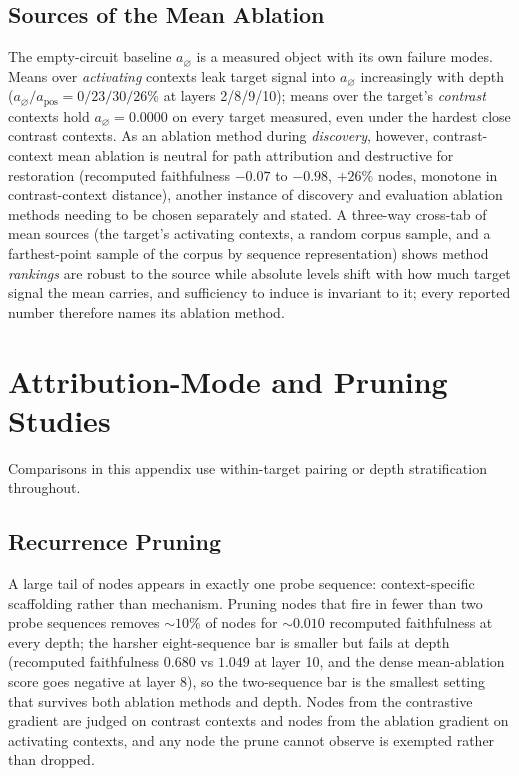 \documentclass[10pt]{article}
\begin{document}
\subsection{Sources of the Mean Ablation}
\label{app:floors}
The empty-circuit baseline $a_{\varnothing}$ is a measured object with its own failure modes.
Means over \emph{activating} contexts leak target signal into $a_{\varnothing}$ increasingly with depth ($a_{\varnothing}/a_{\mathrm{pos}} = 0/23/30/26\%$ at layers 2/8/9/10); means over the target's \emph{contrast} contexts hold $a_{\varnothing} = 0.0000$ on every target measured, even under the hardest close contrast contexts.
As an ablation method during \emph{discovery}, however, contrast-context mean ablation is neutral for path attribution and destructive for restoration (recomputed faithfulness $-0.07$ to $-0.98$, $+26\%$ nodes, monotone in contrast-context distance), another instance of discovery and evaluation ablation methods needing to be chosen separately and stated.
A three-way cross-tab of mean sources (the target's activating contexts, a random corpus sample, and a farthest-point sample of the corpus by sequence representation) shows method \emph{rankings} are robust to the source while absolute levels shift with how much target signal the mean carries, and sufficiency to induce is invariant to it; every reported number therefore names its ablation method.

\section{Attribution-Mode and Pruning Studies}
\label{app:mode-studies}

Comparisons in this appendix use within-target pairing or depth stratification throughout.

\subsection{Recurrence Pruning}
A large tail of nodes appears in exactly one probe sequence: context-specific scaffolding rather than mechanism.
Pruning nodes that fire in fewer than two probe sequences removes ${\sim}10\%$ of nodes for ${\sim}0.010$ recomputed faithfulness at every depth; the harsher eight-sequence bar is smaller but fails at depth (recomputed faithfulness $0.680$ vs $1.049$ at layer 10, and the dense mean-ablation score goes negative at layer 8), so the two-sequence bar is the smallest setting that survives both ablation methods and depth.
Nodes from the contrastive gradient are judged on contrast contexts and nodes from the ablation gradient on activating contexts, and any node the prune cannot observe is exempted rather than dropped.
\end{document}
